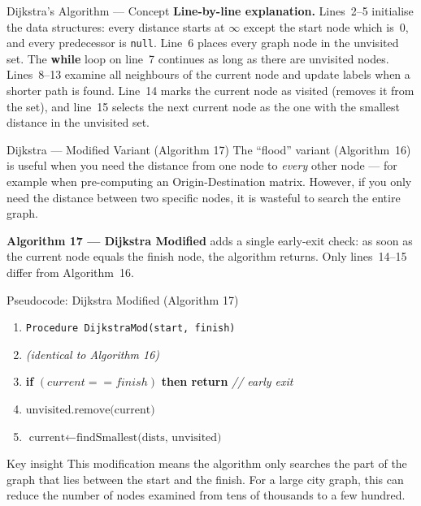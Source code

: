 \documentclass[aspectratio=169,10pt]{beamer}
\begin{document}
\begin{frame}[allowframebreaks]{Dijkstra's Algorithm --- Concept}
  \textbf{Line-by-line explanation.}
  Lines~2--5 initialise the data structures: every distance starts at
  $\infty$ except the start node which is~0, and every predecessor is
  \texttt{null}.  Line~6 places every graph node in the unvisited set.
  The \textbf{while} loop on line~7 continues as long as there are
  unvisited nodes.  Lines~8--13 examine all neighbours of the current
  node and update labels when a shorter path is found.  Line~14 marks the
  current node as visited (removes it from the set), and line~15 selects
  the next current node as the one with the smallest distance in the
  unvisited set.
\end{frame}

\begin{frame}[allowframebreaks]{Dijkstra --- Modified Variant (Algorithm 17)}
  The ``flood'' variant (Algorithm~16) is useful when you need the
  distance from one node to \emph{every} other node --- for example when
  pre-computing an Origin-Destination matrix.  However, if you only need
  the distance between two specific nodes, it is wasteful to search the
  entire graph.

  \medskip
  \textbf{Algorithm 17 --- Dijkstra Modified} adds a single early-exit
  check: as soon as the current node equals the finish node, the algorithm
  returns.  Only lines~14--15 differ from Algorithm~16.

  \begin{block}{Pseudocode: Dijkstra Modified (Algorithm 17)}
  \begin{enumerate}\setcounter{enumi}{0}
    \item[\footnotesize 1:] \texttt{Procedure DijkstraMod(start, finish)}
    \item[\footnotesize 2--13:] \textit{(identical to Algorithm 16)}
    \item[\footnotesize 14:] \quad \textbf{if} $(current == finish)$
      \textbf{then return}   \hfill\textit{// early exit}
    \item[\footnotesize 15:] \quad $\text{unvisited.remove(current)}$
    \item[\footnotesize 16:] \quad $\text{current} \leftarrow
      \text{findSmallest(dists, unvisited)}$
  \end{enumerate}
  \end{block}

  \begin{alertblock}{Key insight}
    This modification means the algorithm only searches the part of the
    graph that lies between the start and the finish.  For a large city
    graph, this can reduce the number of nodes examined from tens of
    thousands to a few hundred.
  \end{alertblock}


\end{frame}
\end{document}
